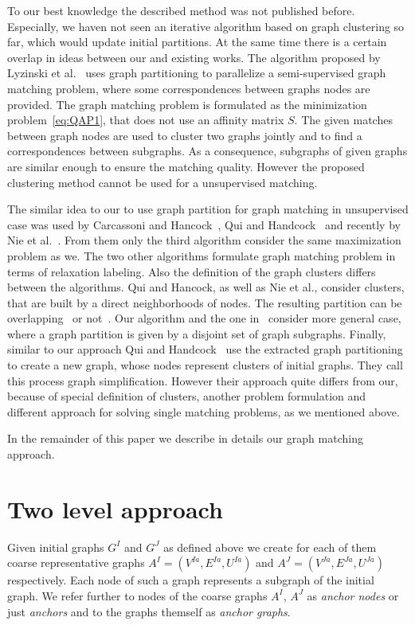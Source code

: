 To our best knowledge the described method was not published before. Especially, we haven not seen an iterative algorithm based on graph clustering so far, which would update initial partitions. At the same time there is a certain overlap in ideas between our and existing works. The algorithm proposed by Lyzinski et al.~\cite{Lyzinski2015} uses graph partitioning to parallelize a semi-supervised graph matching problem, where some correspondences between graphs nodes are provided. The graph matching problem is formulated as the minimization problem~\eqref{eq:QAP1}, that does not use an affinity matrix $S$. The given matches between graph nodes are used to cluster two graphs jointly and to find a correspondences between subgraphs. As a consequence, subgraphs of given graphs are similar enough to ensure the matching quality. However the proposed clustering method cannot be used for a unsupervised matching.

The similar idea to our to use graph partition for graph matching in unsupervised case was used by Carcassoni and Hancock~\cite{Hancock_ModalClusters}, Qui and Handcock~\cite{Hancock_GM_SpectralPart} and recently by Nie et al.~\cite{CliqueGraph_CVPR2015}. From them only the third algorithm consider the same maximization problem as we. The two other algorithms formulate graph matching problem in terms of relaxation labeling. Also the definition of the graph clusters differs between the algorithms. Qui and Hancock, as well as Nie et al., consider clusters, that are built by a direct neighborhoods of nodes. The resulting partition can be overlapping~\cite{CliqueGraph_CVPR2015} or not~\cite{Hancock_GM_SpectralPart}. Our algorithm and the one in~\cite{Hancock_ModalClusters} consider more general case, where a graph partition is given by a disjoint set of graph subgraphs.
Finally, similar to our approach Qui and Handcock~\cite{Hancock_GM_SpectralPart} use the extracted graph partitioning to create a new graph, whose nodes represent clusters of initial graphs. They call this process graph simplification. However their approach quite differs from our, because of special definition of clusters, another problem formulation and different approach for solving single matching problems, as we mentioned above.

In the remainder of this paper we describe in details our graph matching approach.

\section{Two level approach}
Given initial graphs $G^I$ and $G^J$ as defined above we create for each of them coarse representative graphs $A^I=(V^{Ia},E^{Ia}, U^{Ia})$ and $A^J=(V^{Ja},E^{Ja},U^{Ja})$ respectively. Each node of such a graph represents a subgraph of the initial graph. We refer further to nodes of the coarse graphs $A^I$, $A^J$ as \emph{anchor nodes} or just \emph{anchors} and to the graphs themself as \emph{anchor graphs}.

